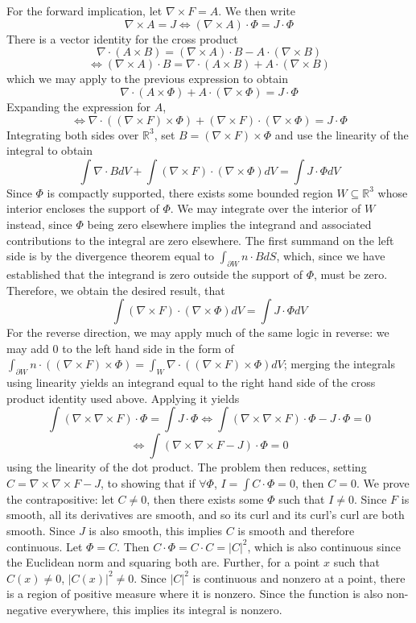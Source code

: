 \documentclass{article}
\begin{document}
\section{}
For the forward implication, let $\nabla \times F = A$. We then write
\[\nabla \times A = J \Leftrightarrow (\nabla\times A) \cdot \Phi = J\cdot \Phi\]
There is a vector identity for the cross product
\[\nabla\cdot (A\times B) = (\nabla \times A)\cdot B -A \cdot (\nabla \times B)\]
\[\Leftrightarrow (\nabla\times A) \cdot B = \nabla \cdot (A\times B) + A\cdot (\nabla \times B)\]
which we may apply to the previous expression to obtain
\[\nabla \cdot(A\times \Phi)+A\cdot (\nabla \times \Phi) = J\cdot \Phi\]
Expanding the expression for $A$,
\[\Leftrightarrow \nabla \cdot ((\nabla \times F) \times \Phi) + (\nabla \times F)\cdot (\nabla \times \Phi) = J\cdot \Phi\]
Integrating both sides over $\mathbb{R}^3$, set $B = (\nabla \times F)\times \Phi$ and use the linearity of the integral to obtain
\[\int \nabla \cdot B dV+\int (\nabla\times F)\cdot (\nabla \times \Phi)dV = \int J\cdot \Phi dV\]
Since $\Phi$ is compactly supported, there exists some bounded region $W\subseteq \mathbb{R}^3$ whose interior encloses the support of $\Phi$.
We may integrate over the interior of $W$ instead, since $\Phi$ being zero elsewhere implies the integrand and associated contributions to the integral are zero elsewhere.
The first summand on the left side is by the divergence theorem equal to
$\int_{\partial W}n\cdot B dS$, which, since we have established that the integrand is zero outside the support of $\Phi$, must be zero.
Therefore, we obtain the desired result, that
\[\int (\nabla\times F)\cdot(\nabla\times\Phi)dV = \int J\cdot \Phi dV\]
For the reverse direction, we may apply much of the same logic in reverse: we may add 0 to the left hand side in the form of $\int_{\partial W}n\cdot ((\nabla \times F)\times \Phi)=\int_W\nabla \cdot ((\nabla \times F)\times \Phi) dV$;
merging the integrals using linearity yields an integrand equal to the right hand side of the cross product identity used above. Applying it yields \[\int (\nabla\times\nabla \times F) \cdot \Phi = \int J \cdot \Phi \Leftrightarrow \int (\nabla\times\nabla\times F)\cdot \Phi - J\cdot \Phi = 0\]
\[\Leftrightarrow \int (\nabla\times\nabla\times F - J)\cdot \Phi = 0\]
using the linearity of the dot product. The problem then reduces, setting $C=\nabla\times\nabla\times F -J$, to showing that if $\forall\Phi$, $I=\int C\cdot \Phi = 0$, then $C=0$. We prove the contrapositive: let $C\neq 0$, then there exists some $\Phi$ such that $I\neq 0$. Since $F$ is smooth, all its derivatives are smooth, and so its curl and its curl's curl are both smooth. Since $J$ is also smooth, this implies $C$ is smooth and therefore continuous. Let $\Phi = C$. Then $C\cdot \Phi = C\cdot C = |C|^2$, which is also continuous since the Euclidean norm and squaring both are. Further, for a point $x$ such that $C(x)\neq 0$, $|C(x)|^2\neq 0$. Since $|C|^2$ is continuous and nonzero at a point, there is a region of positive measure where it is nonzero. Since the function is also non-negative everywhere, this implies its integral is nonzero.
\end{document}

